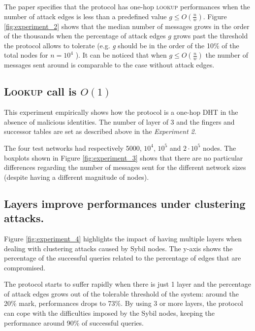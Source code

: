 The paper specifies that the protocol has one-hop \textsc{lookup} performances when the number of attack edges is less than a predefined value $g \leq O(\frac{n}{w})$. 
Figure \ref{fig:experiment_2} shows that the median number of messages grows in the order of the thousands when the percentage of attack edges $g$ grows past the threshold the protocol allows to tolerate (e.g. \textit{g} should be in the order of the 10\% of the total nodes for $n=10^4$ ). It can be noticed that when $g\leq O(\frac{n}{w})$  the number of messages sent around is comparable to the case without attack edges.

\subsection{\textsc{Lookup} call is $O(1)$}

This experiment empirically shows how the protocol is a one-hop DHT in the absence of malicious identities. The number of layer of 3 and the fingers and successor tables are set as described above in the \textit{Experiment 2}.

The four test networks had respectively 5000, $10^4$, $10^5$ and $2\cdot 10^5$ nodes. The boxplots shown in Figure \ref{fig:experiment_3} shows that there are no particular differences regarding the number of messages sent for the different network sizes (despite having a different magnitude of nodes).

\subsection{Layers improve performances under clustering attacks.}

Figure \ref{fig:experiment_4} highlights the impact of having multiple layers when dealing with clustering attacks caused by Sybil nodes. The y-axis shows the percentage of the successful queries related to the percentage of edges that are compromised.

The protocol starts to suffer rapidly when there is just 1 layer and the percentage of attack edges grows out of the tolerable threshold of the system: around the 20\% mark, performances drops to 73\%. By using  3 or more layers, the protocol can cope with the difficulties imposed by the Sybil nodes, keeping the performance around 90\% of successful queries.

